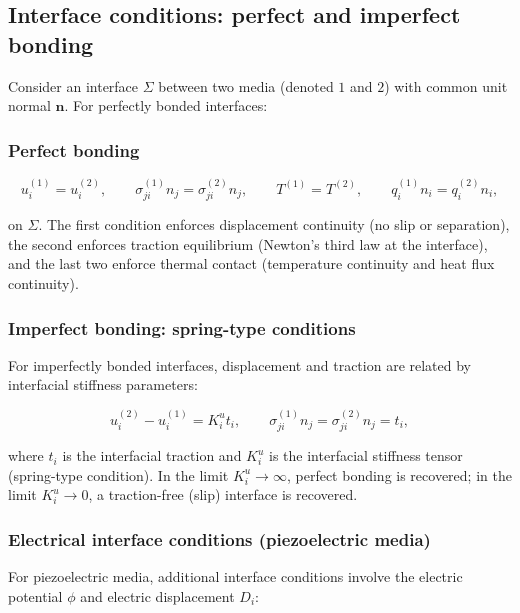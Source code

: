 \subsection{Interface conditions: perfect and imperfect bonding}
\label{sec:3.9}

Consider an interface $\Sigma$ between two media (denoted $1$ and $2$) with common unit normal $\bm{n}$. For perfectly bonded interfaces:

\subsubsection{Perfect bonding}

\begin{equation}
u_i^{(1)} = u_i^{(2)},
\qquad
\sigma_{ji}^{(1)}n_j = \sigma_{ji}^{(2)}n_j,
\qquad
T^{(1)} = T^{(2)},
\qquad
q_i^{(1)}n_i = q_i^{(2)}n_i,
\label{eq:3.31}
\end{equation}

on $\Sigma$. The first condition enforces displacement continuity (no slip or separation), the second enforces traction equilibrium (Newton's third law at the interface), and the last two enforce thermal contact (temperature continuity and heat flux continuity).

\subsubsection{Imperfect bonding: spring-type conditions}

For imperfectly bonded interfaces, displacement and traction are related by interfacial stiffness parameters:

\begin{equation}
u_i^{(2)} - u_i^{(1)} = K_i^u t_i,
\qquad
\sigma_{ji}^{(1)}n_j = \sigma_{ji}^{(2)}n_j = t_i,
\label{eq:3.32}
\end{equation}

where $t_i$ is the interfacial traction and $K_i^u$ is the interfacial stiffness tensor (spring-type condition). In the limit $K_i^u \to \infty$, perfect bonding is recovered; in the limit $K_i^u \to 0$, a traction-free (slip) interface is recovered.

\subsubsection{Electrical interface conditions (piezoelectric media)}

For piezoelectric media, additional interface conditions involve the electric potential $\phi$ and electric displacement $D_i$:


